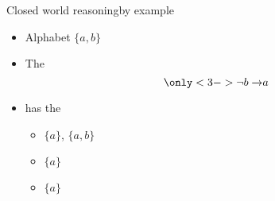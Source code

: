 \begin{frame}{Closed world reasoning}{by example}
  \bigskip
  \begin{itemize}
  \item Alphabet $\{a,b\}$
    \medskip
  \item<2-> The 
    \[
      \only<3->{\neg b\to} a
    \]
  \item<2->[] has the
    \par\smallskip
    \begin{itemize}\normalsize
    \item {}         $\{a\}$, $\{a,b\}$
      \smallskip
    \item {} $\{a\}$
      \smallskip
    \item {}  $\{a\}$
    \end{itemize}
  \end{itemize}
\end{frame}
%
